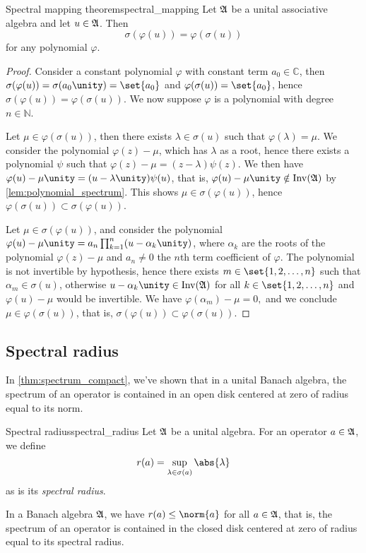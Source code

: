 \begin{theorem}{Spectral mapping theorem}{spectral_mapping}
    Let \(\mathfrak{A}\) be a unital associative algebra and let \(u \in \mathfrak{A}\). Then
    \begin{equation*}
        \sigma(\varphi(u)) = \varphi(\sigma(u))
    \end{equation*}
    for any polynomial \(\varphi\).
\end{theorem}
\begin{proof}
    Consider a constant polynomial \(\varphi\) with constant term \(a_0 \in \mathbb{C}\), then \(\sigma(\varphi(u)) = \sigma(a_0\unity) = \set{a_0}\) and \(\varphi(\sigma(u)) = \set{a_0}\), hence \(\sigma(\varphi(u)) = \varphi(\sigma(u))\). We now suppose \(\varphi\) is a polynomial with degree \(n \in \mathbb{N}\).

    Let \(\mu \in \varphi(\sigma(u))\), then there exists \(\lambda \in \sigma(u)\) such that \(\varphi(\lambda) = \mu\). We consider the polynomial \(\varphi(z) - \mu\), which has \(\lambda\) as a root, hence there exists a polynomial \(\psi\) such that \(\varphi(z) - \mu = (z - \lambda)\psi(z)\). We then have \(\varphi(u) - \mu \unity = (u - \lambda \unity)\psi(u)\), that is, \(\varphi(u) - \mu \unity \notin \invertible{\algebra{A}}\) by \cref{lem:polynomial_spectrum}. This shows \(\mu \in \sigma(\varphi(u))\), hence \(\varphi(\sigma(u)) \subset \sigma(\varphi(u))\).

    Let \(\mu \in \sigma(\varphi(u))\), and consider the polynomial \(\varphi(u) - \mu\unity = a_n \prod_{k=1}^n (u - \alpha_k\unity)\), where \(\alpha_k\) are the roots of the polynomial \(\varphi(z) - \mu\) and \(a_n \neq 0\) the \(n\)th term coefficient of \(\varphi\). The polynomial is not invertible by hypothesis, hence there exists \(m \in \set{1,2,\dots, n}\) such that \(\alpha_m \in \sigma(u)\), otherwise \(u - \alpha_k \unity \in \invertible{\algebra{A}}\) for all \(k \in \set{1,2, \dots, n}\) and \(\varphi(u) - \mu\) would be invertible. We have \(\varphi(\alpha_m) - \mu = 0,\) and we conclude \(\mu \in \varphi(\sigma(u))\), that is, \(\sigma(\varphi(u)) \subset \varphi(\sigma(u))\).
\end{proof}

\subsection{Spectral radius}
In \cref{thm:spectrum_compact}, we've shown that in a unital Banach algebra, the spectrum of an operator is contained in an open disk centered at zero of radius equal to its norm.
\begin{definition}{Spectral radius}{spectral_radius}
    Let \(\mathfrak{A}\) be a unital algebra. For an operator \(a \in \mathfrak{A}\), we define
    \begin{equation*}
        r(a) = \sup_{\lambda \in \sigma(a)}{\abs{\lambda}}
    \end{equation*}
    as is its \emph{spectral radius}.
\end{definition}
In a Banach algebra \(\mathfrak{A}\), we have \(r(a) \leq \norm{a}\) for all \(a \in \mathfrak{A}\), that is, the spectrum of an operator is contained in the closed disk centered at zero of radius equal to its spectral radius.

